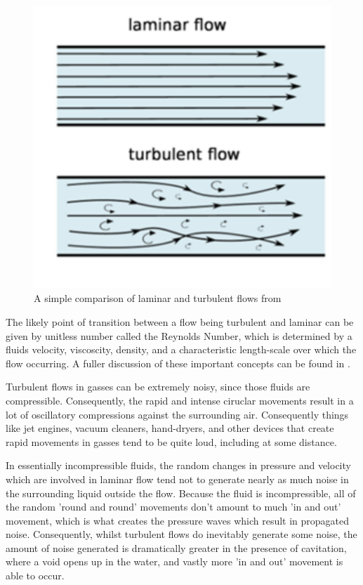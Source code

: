 \documentclass{article}\usepackage[]{graphicx}\usepackage[]{color}
\begin{document}
\begin{figure}
\includegraphics[width=\textwidth]{LaminarTurbulent.png}
\caption{A simple comparison of laminar and turbulent flows from \parencite{NPdotnet2017}}
\label{fig:LaminarTurbulent.png}
\end{figure}

The likely point of transition between a flow being turbulent and laminar can be given by unitless number called the Reynolds Number, which is determined by a fluids velocity, viscoscity, density, and a characteristic length-scale over which the flow occurring.  A fuller discussion of these important concepts can be found in \cite{NPdotnet2017}.

Turbulent flows in gasses can be extremely noisy, since those fluids are compressible.  Consequently, the rapid and intense ciruclar movements result in a lot of oscillatory compressions against the surrounding air.  Consequently things like jet engines, vacuum cleaners, hand-dryers, and other devices that create rapid movements in gasses tend to be quite loud, including at some distance.

In essentially incompressible fluids, the random changes in pressure and velocity which are involved in laminar flow tend not to generate nearly as much noise in the surrounding liquid outside the flow.  Because the fluid is incompressible, all of the random 'round and round' movements don't amount to much 'in and out' movement, which is what creates the pressure waves which result in propagated noise. Consequently, whilst turbulent flows do inevitably generate some noise, the amount of noise generated is dramatically greater in the presence of cavitation, where a void opens up in the water, and vastly more 'in and out' movement is able to occur.
\end{document}
